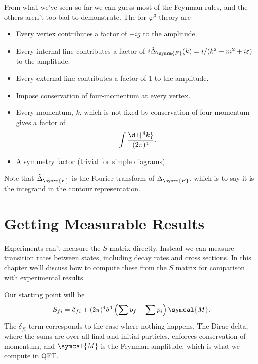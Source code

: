 \documentclass[fleqn]{NotesClass}
\newcommand{\feynman}{\symrm{F}}
\newcommand{\amplitude}{\symcal{M}}
\begin{document}
    From what we've seen so far we can guess most of the Feynman rules, and the others aren't too bad to demonstrate.
    The  for \(\varphi^3\) theory are
    \begin{itemize}
        \item Every vertex contributes a factor of \(-ig\) to the amplitude.
        \item Every internal line contributes a factor of \(i\tilde{\Delta}_{\feynman}(k) = i/(k^2 - m^2 + i\varepsilon)\) to the amplitude.
        \item Every external line contributes a factor of \(1\) to the amplitude.
        \item Impose conservation of four-momentum at every vertex.
        \item Every momentum, \(k\), which is not fixed by conservation of four-momentum gives a factor of
        \begin{equation}
            \int \frac{\dl{^4k}}{(2\pi)^4}.
        \end{equation}
        \item A symmetry factor (trivial for simple diagrams).
    \end{itemize}
    Note that \(\tilde{\Delta}_{\feynman}\) is the Fourier transform of \(\Delta_{\feynman}\), which is to say it is the integrand in the contour representation.
    
    \chapter{Getting Measurable Results}
    Experiments can't measure the \(S\) matrix directly.
    Instead we can measure transition rates between states, including decay rates and cross sections.
    In this chapter we'll discuss how to compute these from the \(S\) matrix for comparison with experimental results.
    
    Our starting point will be
    \begin{equation}
        S_{fi} = \delta_{fi} + (2\pi)^4\delta^4\left( \sum p_f - \sum p_i \right) \amplitude.
    \end{equation}
    The \(\delta_{fi}\) term corresponds to the case where nothing happens.
    The Dirac delta, where the sums are over all final and initial particles, enforces conservation of momentum, and \(\amplitude\) is the Feynman amplitude, which is what we compute in QFT.
    
\end{document}
